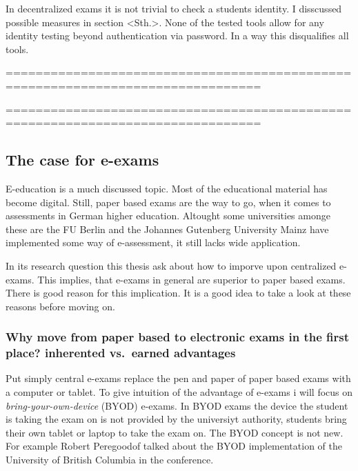In decentralized exams it is not trivial to check a students identity. I
disscussed possible measures in section \textless{}Sth.\textgreater{}.
None of the tested tools allow for any identity testing beyond
authentication via password. In a way this disqualifies all tools.

================================================================================

================================================================================

\hypertarget{the-case-for-e-exams}{%
\subsection{The case for e-exams}\label{the-case-for-e-exams}}

E-education is a much discussed topic. Most of the educational material
has become digital. Still, paper based exams are the way to go, when it
comes to assessments in German higher education. Altought some
universities amonge these are the FU Berlin and the Johannes Gutenberg
University Mainz have implemented some way of e-assessment, it still
lacks wide application.

In its research question this thesis ask about how to imporve upon
centralized e-exams. This implies, that e-exams in general are superior
to paper based exams. There is good reason for this implication. It is a
good idea to take a look at these reasons before moving on.

\hypertarget{why-move-from-paper-based-to-electronic-exams-in-the-first-place-inherented-vs.-earned-advantages}{%
\subsubsection{Why move from paper based to electronic exams in the
first place? inherented vs.~earned
advantages}\label{why-move-from-paper-based-to-electronic-exams-in-the-first-place-inherented-vs.-earned-advantages}}

Put simply central e-exams replace the pen and paper of paper based
exams with a computer or tablet. To give intuition of the advantage of
e-exams i will focus on \emph{bring-your-own-device} (BYOD) e-exams. In
BYOD exams the device the student is taking the exam on is not provided
by the universiyt authority, students bring their own tablet or laptop
to take the exam on. The BYOD concept is not new. For example Robert
Peregoodof talked about the BYOD implementation of the University of
British Columbia in the conference.

